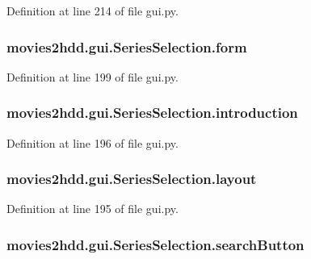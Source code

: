 Definition at line 214 of file gui.\-py.

\hypertarget{classmovies2hdd_1_1gui_1_1_series_selection_a514dd2b23706781594fe9d9886a28218}{
\subsubsection[{form}]{\setlength{\rightskip}{0pt plus 5cm}movies2hdd.\-gui.\-Series\-Selection.\-form}}\label{classmovies2hdd_1_1gui_1_1_series_selection_a514dd2b23706781594fe9d9886a28218}


Definition at line 199 of file gui.\-py.

\hypertarget{classmovies2hdd_1_1gui_1_1_series_selection_ae741cee9fe3b6d64c1e62413c063d7b1}{
\subsubsection[{introduction}]{\setlength{\rightskip}{0pt plus 5cm}movies2hdd.\-gui.\-Series\-Selection.\-introduction}}\label{classmovies2hdd_1_1gui_1_1_series_selection_ae741cee9fe3b6d64c1e62413c063d7b1}


Definition at line 196 of file gui.\-py.

\hypertarget{classmovies2hdd_1_1gui_1_1_series_selection_a1d4759f70508c7fbcbf5ce849d6cee76}{
\subsubsection[{layout}]{\setlength{\rightskip}{0pt plus 5cm}movies2hdd.\-gui.\-Series\-Selection.\-layout}}\label{classmovies2hdd_1_1gui_1_1_series_selection_a1d4759f70508c7fbcbf5ce849d6cee76}


Definition at line 195 of file gui.\-py.

\hypertarget{classmovies2hdd_1_1gui_1_1_series_selection_a3ef4927decef147a124124515ab71114}{
\subsubsection[{search\-Button}]{\setlength{\rightskip}{0pt plus 5cm}movies2hdd.\-gui.\-Series\-Selection.\-search\-Button}}\label{classmovies2hdd_1_1gui_1_1_series_selection_a3ef4927decef147a124124515ab71114}


